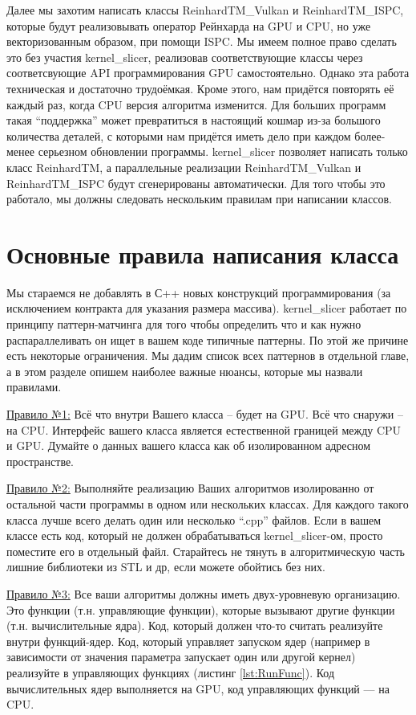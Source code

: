 \documentclass[11pt,fleqn,english,russian]{report} %
\begin{document}
Далее мы захотим написать классы ReinhardTM\_Vulkan и ReinhardTM\_ISPC, которые будут реализовывать оператор Рейнхарда на GPU и CPU, но уже векторизованным образом, при помощи ISPC. Мы имеем полное право сделать это без участия kernel\_slicer, реализовав соответствующие классы через соответсвующие API программирования GPU самостоятельно. Однако эта работа техническая и достаточно трудоёмкая. Кроме этого, нам придётся повторять её каждый раз, когда CPU версия алгоритма изменится. Для больших программ такая ``поддержка'' может превратиться в настоящий кошмар из-за большого количества деталей, с которыми нам придётся иметь дело при каждом более-менее серьезном обновлении программы. kernel\_slicer позволяет написать только класс ReinhardTM, а параллельные реализации ReinhardTM\_Vulkan и ReinhardTM\_ISPC будут сгенерированы автоматически. Для того чтобы это работало, мы должны следовать нескольким правилам при написании классов.

\section{Основные правила написания класса}

Мы стараемся не добавлять в С++ новых конструкций программирования (за исключением контракта для указания размера массива). kernel\_slicer работает по принципу паттерн-матчинга для того чтобы определить что и как нужно распараллеливать он ищет в вашем коде типичные паттерны. По этой же причине есть некоторые ограничения. Мы дадим список всех паттернов в отдельной главе, а в этом разделе опишем наиболее важные нюансы, которые мы назвали правилами.

\underline{Правило №1:} Всё что внутри Вашего класса -- будет на GPU. Всё что снаружи -- на CPU. Интерфейс вашего класса является естественной границей между CPU и GPU. Думайте о данных вашего класса как об изолированном адресном пространстве.

\underline{Правило №2:} Выполняйте реализацию Ваших алгоритмов изолированно от остальной части программы в одном или нескольких классах. Для каждого такого класса лучше всего делать один или несколько ``.cpp'' файлов. Если в вашем классе есть код, который не должен обрабатываться kernel\_slicer-ом, просто поместите его в отдельный файл. Старайтесь не тянуть в алгоритмическую часть лишние библиотеки из STL и др, если можете обойтись без них.

\underline{Правило №3:} Все ваши алгоритмы должны иметь двух-уровневую организацию. Это функции (т.н. управляющие функции), которые вызывают другие функции (т.н. вычислительные ядра). Код, который должен что-то считать реализуйте внутри функций-ядер. Код, который управляет запуском ядер (например в зависимости от значения параметра запускает один или другой кернел) реализуйте в управляющих функциях (листинг \ref{lst:RunFunc}). Код вычислительных ядер выполняется на GPU, код управляющих функций --- на CPU.
\end{document}
